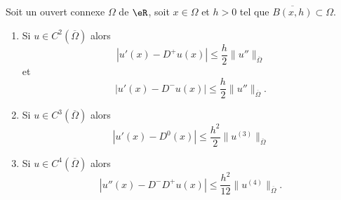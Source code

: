 \begin{lemma}       \label{LEMooZECZooVKxOZZ}
	Soit un ouvert connexe \( \Omega\) de \( \eR\), soit \( x\in \Omega\) et \( h>0\) tel que \( \overline{ B(x,h) }\subset \Omega\).
	\begin{enumerate}
		\item
		      Si \( u\in C^2(\overline{ \Omega })\) alors
		      \begin{equation}
			      | u'(x)-D^+u(x) |\leq \frac{ h }{2}\| u'' \|_{\overline{ \Omega }}
		      \end{equation}
		      et
		      \begin{equation}
			      | u'(x)-D^-u(x) |\leq \frac{ h }{2}\| u'' \|_{\overline{ \Omega }}.
		      \end{equation}
		\item       \label{ITEMooSAWJooJUTWAb}
		      Si \( u\in C^3(\overline{ \Omega })\) alors
		      \begin{equation}
			      | u'(x)-D^0(x) |\leq \frac{ h^2 }{2}\| u^{(3)} \|_{\overline{ \Omega }}
		      \end{equation}
		\item       \label{ITEMooRWUHooZJLKuL}
		      Si \( u\in C^4(\overline{ \Omega })\) alors
		      \begin{equation}
			      | u''(x)-D^-D^+u(x) |\leq \frac{ h^2 }{ 12 }\| u^{(4)} \|_{\overline{ \Omega }}.
		      \end{equation}
	\end{enumerate}
\end{lemma}

